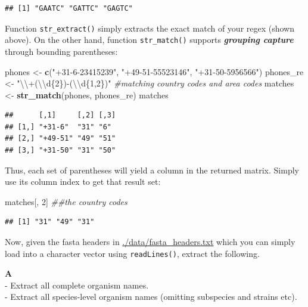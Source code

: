 \documentclass[]{book}
\newenvironment{Shaded}{\begin{snugshade}}{\end{snugshade}}
\newcommand{\CharTok}[1]{\textcolor[rgb]{0.31,0.60,0.02}{#1}}
\newcommand{\CommentTok}[1]{\textcolor[rgb]{0.56,0.35,0.01}{\textit{#1}}}
\newcommand{\DecValTok}[1]{\textcolor[rgb]{0.00,0.00,0.81}{#1}}
\newcommand{\KeywordTok}[1]{\textcolor[rgb]{0.13,0.29,0.53}{\textbf{#1}}}
\newcommand{\NormalTok}[1]{#1}
\newcommand{\StringTok}[1]{\textcolor[rgb]{0.31,0.60,0.02}{#1}}
\begin{document}
\begin{verbatim}
## [1] "GAATC" "GATTC" "GAGTC"
\end{verbatim}

Function \texttt{str\_extract()} simply extracts the exact match of your regex (shown above). On the other hand, function \texttt{str\_match()} supports \textbf{\emph{grouping capture}} through bounding parentheses:

\begin{Shaded}
\begin{Highlighting}[]
\NormalTok{phones <-}\StringTok{ }\KeywordTok{c}\NormalTok{(}\StringTok{"+31-6-23415239"}\NormalTok{, }\StringTok{"+49-51-55523146"}\NormalTok{, }\StringTok{"+31-50-5956566"}\NormalTok{)}
\NormalTok{phones_re <-}\StringTok{ "}\CharTok{\textbackslash{}\textbackslash{}}\StringTok{+(}\CharTok{\textbackslash{}\textbackslash{}}\StringTok{d\{2\})-(}\CharTok{\textbackslash{}\textbackslash{}}\StringTok{d\{1,2\})"} \CommentTok{#matching country codes and area codes}
\NormalTok{matches <-}\StringTok{ }\KeywordTok{str_match}\NormalTok{(phones, phones_re) }
\NormalTok{matches}
\end{Highlighting}
\end{Shaded}

\begin{verbatim}
##      [,1]     [,2] [,3]
## [1,] "+31-6"  "31" "6" 
## [2,] "+49-51" "49" "51"
## [3,] "+31-50" "31" "50"
\end{verbatim}

Thus, each set of parentheses will yield a column in the returned matrix. Simply use its column index to get that result set:

\begin{Shaded}
\begin{Highlighting}[]
\NormalTok{matches[, }\DecValTok{2}\NormalTok{] }\CommentTok{##the country codes}
\end{Highlighting}
\end{Shaded}

\begin{verbatim}
## [1] "31" "49" "31"
\end{verbatim}

Now, given the fasta headers in \url{./data/fasta_headers.txt}
which you can simply load into a character vector using \texttt{readLines()}, extract the following.

\textbf{A}\\
- Extract all complete organism names.\\
- Extract all species-level organism names (omitting subspecies and strains etc).
\end{document}
